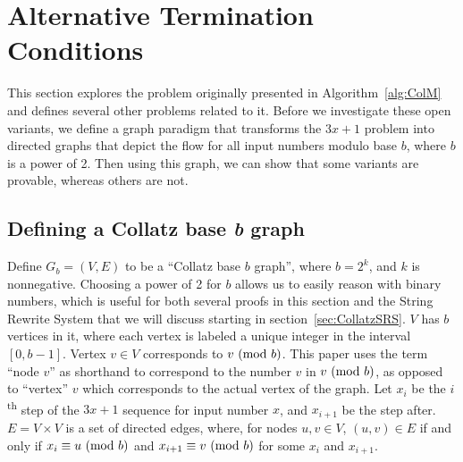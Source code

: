 \chapter{Alternative Termination Conditions} \label{sec:alttercdns}
 This section explores the problem originally presented in Algorithm~\ref{alg:ColM} and defines several other problems related to it. Before we investigate these open variants, we define a graph paradigm that transforms the $3x+1$ problem into directed graphs that depict the flow for all input numbers modulo base $b$, where $b$ is a power of 2. Then using this graph, we can show that some variants are provable, whereas others are not.
\section{Defining a Collatz base \textit{b} graph} \label{subsec:colgraph}
Define $G_b=(V,E)$ to be a ``Collatz base $b$ graph'', where $b = 2^k$, and $k$ is nonnegative. Choosing a power of 2 for $b$ allows us to easily reason with binary numbers, which is useful for both several proofs in this section and the String Rewrite System that we will discuss starting in section~\ref{sec:CollatzSRS}. $V$ has $b$ vertices in it, where each vertex is labeled a unique integer in the interval $[0, b-1]$. Vertex $v \in V$ corresponds to $v \ (\mathrm{mod}\ b)$. This paper uses the term ``node $v$'' as shorthand to correspond to the number $v$ in $v \ (\mathrm{mod}\ b)$, as opposed to ``vertex'' $v$ which corresponds to the actual vertex of the graph. Let $x_i$ be the $i$\textsuperscript{th} step of the $3x+1$ sequence for input number $x$, and $x_{i+1}$ be the step after. $E = V \times V$ is a set of directed edges, where, for nodes $u, v \in V$, $(u,v) \in E$ if and only if $x_i \equiv u \ (\mathrm{mod}\ b)$ and $x_{i+1} \equiv v \ (\mathrm{mod}\ b)$ for some $x_i$ and $x_{i+1}$. \par

